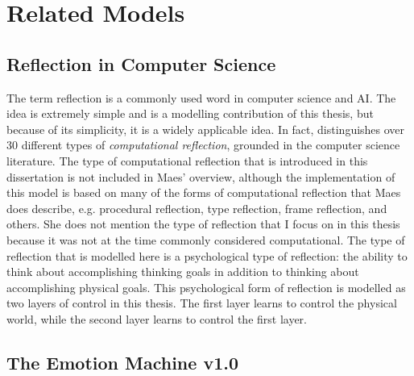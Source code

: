 \chapter{Related Models}
\label{chapter:related_models}

\section{Reflection in Computer Science}

The term reflection is a commonly used word in computer science and
AI.  The idea is extremely simple and is a modelling contribution of
this thesis, but because of its simplicity, it is a widely applicable
idea.  In fact, \cite{maes:1988} distinguishes over 30 different types
of \emph{computational reflection}, grounded in the computer science
literature.  The type of computational reflection that is introduced
in this dissertation is not included in Maes' overview, although the
implementation of this model is based on many of the forms of
computational reflection that Maes does describe, e.g. procedural
reflection, type reflection, frame reflection, and others.  She does
not mention the type of reflection that I focus on in this thesis
because it was not at the time commonly considered computational.  The
type of reflection that is modelled here is a psychological type of
reflection: the ability to think about accomplishing thinking goals in
addition to thinking about accomplishing physical goals.  This
psychological form of reflection is modelled as two layers of control
in this thesis.  The first layer learns to control the physical world,
while the second layer learns to control the first layer.

\section{The Emotion Machine v1.0}

